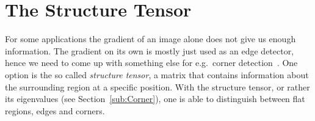 \section{The Structure Tensor}\label{sec:Structure}
For some applications the gradient of an image alone does not give us enough information. The
gradient on its own is mostly just used as an edge detector, hence we need to come up with
something else for e.g.\ corner detection~\cite{ipcv}. One option is the so called \textit{structure tensor}, a
matrix that contains information about the surrounding region at a specific position. With the
structure tensor, or rather its eigenvalues (see Section~\ref{sub:Corner}), one is able to
distinguish between flat regions, edges and corners.

